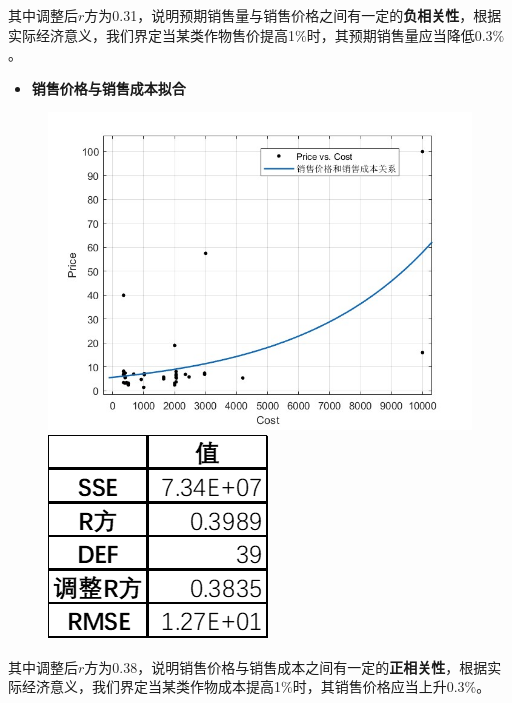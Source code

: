 \documentclass[withoutpreface,bwprint]{cumcmthesis} %
\begin{document}
其中调整后$r$方为0.31，说明预期销售量与销售价格之间有一定的\textbf{负相关性}，根据实际经济意义，我们界定当某类作物售价提高1$\%$时，其预期销售量应当降低0.3$\%$。
\begin{itemize}
	\item \textbf{销售价格与销售成本拟合}
\end{itemize}
\begin{figure}[H]
	\centering
	\begin{minipage}[c]{0.48\textwidth}
		\centering
		\includegraphics[height=0.2\textheight]{销售价格和成本}
	\end{minipage}
	\begin{minipage}[c]{0.48\textwidth}
		\centering
		\includegraphics[height=0.2\textheight]{222}
	\end{minipage}
\end{figure}

其中调整后$r$方为0.38，说明销售价格与销售成本之间有一定的\textbf{正相关性}，根据实际经济意义，我们界定当某类作物成本提高1\%时，其销售价格应当上升0.3\%。
\end{document}
